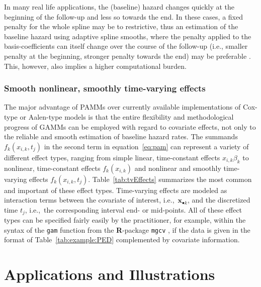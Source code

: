 \documentclass[submit]{smj}
\newcommand{\bfx}{\mathbf{x}}
\newcommand{\Rlang}{\textbf{\textsf{R}}}
\begin{document}
In many real life applications, the (baseline) hazard changes quickly at the
beginning of the follow-up and less so towards the end. In these cases,
a fixed penalty for the whole spline may be to restrictive, thus an estimation
of the baseline hazard using adaptive spline smooths, where the penalty applied
to the basis-coefficients can itself change over the course of the follow-up
(i.e., smaller penalty at the beginning, stronger penalty towards the end) may
be preferable \citep{Wood:2011}. This, however, also implies a higher computational
burden.


\subsubsection{Smooth nonlinear, smoothly time-varying effects}\label{sssec:tvEffects}

The major advantage of PAMMs over currently available implementations of Cox-type or Aalen-type models is that the entire flexibility and
methodological progress of GAMMs can be employed with regard to covariate effects,
not only to the reliable and smooth estimation of baseline hazard rates.
The summands $f_k(x_{i,k}, t_j)$ in the second term in
equation~\eqref{eq:pam} can represent a variety of different effect types, ranging
from simple linear, time-constant effects $x_{i,k}\beta_k$ to nonlinear,
time-constant effects $f_k(x_{i,k})$ and nonlinear and smoothly time-varying effects
$f_k(x_{i,k}, t_j)$.
Table~\ref{tab:tvEffects} summarizes the most common and important of these effect types.
Time-varying effects are modeled as interaction terms between
the covariate of interest, i.e.,\ $\bfx_{\bullet k}$, and the discretized time $t_j$,
i.e.,\ the corresponding interval end- or mid-points.
All of these effect types can be specified fairly easily by the practitioner, for
example, within the syntax of the \texttt{gam} function from the
\Rlang-package \texttt{mgcv} \citep{Wood2017}, if the data is given in the format
of Table~\ref{tab:example:PED} complemented by covariate information.



\section{Applications and Illustrations}\label{sec:Applications}
\end{document}
